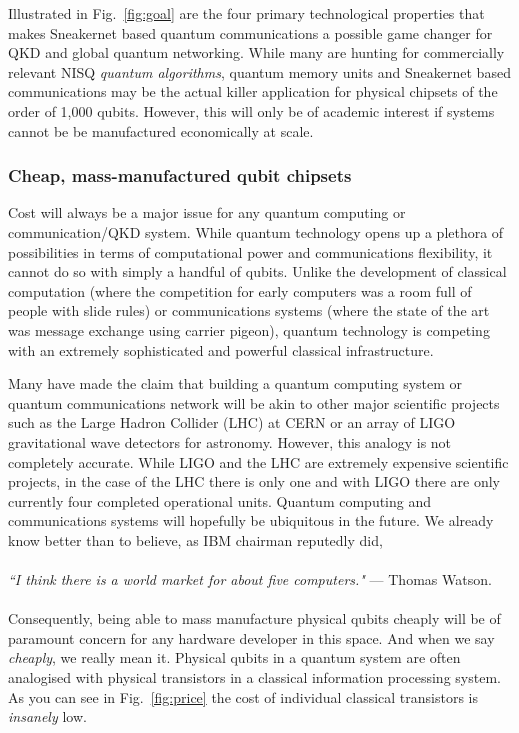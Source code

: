 \documentclass[twocolumn, aps, rmp, amsmath, amssymb, nofootinbib, superscriptaddress, longbibliography, floatfix, table-of-contents, eqsecnum]{revtex4-2}
\newcommand{\famousquote}[2]{\noindent\textit{``#1"} --- #2.\index{Quotes}\index{#2}}
\begin{document}
Illustrated in Fig.~\ref{fig:goal} are the four primary technological properties that makes Sneakernet based quantum communications a possible game changer for QKD and global quantum networking. While many are hunting for commercially relevant NISQ \textit{quantum algorithms}, quantum memory units and Sneakernet based communications may be the actual killer application for physical chipsets of the order of 1,000 qubits. However, this will only be of academic interest if systems cannot be be manufactured economically at scale.

\subsubsection{Cheap, mass-manufactured qubit chipsets}

Cost will always be a major issue for any quantum computing or communication/QKD system. While quantum technology opens up a plethora of possibilities in terms of computational power and communications flexibility, it cannot do so with simply a handful of qubits. Unlike the development of classical computation (where the competition for early computers was a room full of people with slide rules) or communications systems (where the state of the art was message exchange using carrier pigeon), quantum technology is competing with an extremely sophisticated and powerful classical infrastructure. 

Many have made the claim that building a quantum computing system or quantum communications network will be akin to other major scientific projects such as the Large Hadron Collider (LHC) at CERN or an array of LIGO gravitational wave detectors for astronomy. However, this analogy is not completely accurate. While LIGO and the LHC are extremely expensive scientific projects, in the case of the LHC there is only one and with LIGO there are only currently four completed operational units. Quantum computing and communications systems will hopefully be ubiquitous in the future. We already know better than to believe, as IBM chairman reputedly did,
\\
\\
\famousquote{I think there is a world market for about five computers.}{Thomas Watson}
\\
\\
Consequently, being able to mass manufacture physical qubits cheaply will be of paramount concern for any hardware developer in this space. And when we say \textit{cheaply}, we really mean it. Physical qubits in a quantum system are often analogised with physical transistors in a classical information processing system. As you can see in Fig.~\ref{fig:price} the cost of individual classical transistors is \textit{insanely} low. 
 
\end{document}
